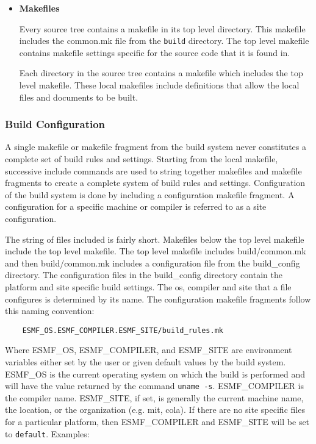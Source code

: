 \begin{itemize}
\begin{description}
\end{description}


\item{{\bf Makefiles}}

Every source tree contains a makefile in its top level directory.  This
makefile includes the common.mk file from the {\tt build} directory.
The top level makefile contains makefile settings specific for the
source code that it is found in.

Each directory in the source tree contains a makefile which includes
the top level makefile.  These local makefiles include definitions that
allow the local files and documents to be built.
\end{itemize}

\subsubsection{Build Configuration}

A single makefile or makefile fragment from the build system never
constitutes a complete set of build rules and settings.  Starting from
the local makefile, successive include commands are used to string
together makefiles and makefile fragments to create a complete system
of build rules and settings.  Configuration of the build system is
done by including a configuration makefile fragment. A configuration for a
specific machine or compiler is referred to as a site configuration.

The string of files included is fairly short.  Makefiles below the top
level makefile include the top level makefile. The top level makefile
includes build/common.mk and then build/common.mk includes a
configuration file from the build\_config directory.  The configuration
files in the build\_config directory contain the platform and site
specific build settings.  The os, compiler and site that a file
configures is determined by its name.  The configuration makefile
fragments follow this naming convention:

\begin{verbatim}
    ESMF_OS.ESMF_COMPILER.ESMF_SITE/build_rules.mk
\end{verbatim}

Where ESMF\_OS, ESMF\_COMPILER, and ESMF\_SITE are environment
variables either set by the user or given default values by the build
system. ESMF\_OS is the current operating system on which the build is
performed and will have the value returned by the command {\tt uname -s}.
ESMF\_COMPILER is the compiler name. ESMF\_SITE, if set, is generally the
current machine name, the location, or the organization (e.g. mit, cola).  If
there are no site specific files for a particular platform, then 
ESMF\_COMPILER and ESMF\_SITE will be set to {\tt default}.  Examples:

